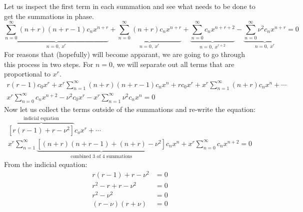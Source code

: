 Let us inspect the first term in each summation and see what needs to be done to get the summations in phase.
\begin{equation*}
\underbrace{\sum\limits_{n=0}^{\infty}(n+r)(n+r-1)c_nx^{n+r}}_{n=0, \ x^r} + \underbrace{\sum\limits_{n=0}^{\infty}(n+r)c_nx^{n+r}}_{n=0, \ x^r} + \underbrace{\sum\limits_{n=0}^{\infty}c_nx^{n+r+2}}_{n=0, \ x^{r+2}} - \underbrace{\sum\limits_{n=0}^{\infty}\nu^2c_n x^{n+r}}_{n=0, \ x^r} = 0
\end{equation*}
For reasons that (hopefully) will become apparant, we are going to go through this process in two steps.  For $n=0$, we will separate out all terms that are proportional to $x^r$.
\begin{multline*}
r(r-1)c_0x^r + x^r\sum\limits_{n=1}^{\infty}(n+r)(n+r-1)c_nx^n + rc_0x^r + x^r\sum\limits_{n=1}^{\infty}(n+r)c_nx^n + \cdots \\
x^r\sum\limits_{n=0}^{\infty}c_nx^{n+2} - \nu^2c_0x^r - x^r\sum\limits_{n=1}^{\infty}\nu^2c_nx^{n} = 0
\end{multline*}
Now let us collect the terms outside of the summations and re-write the equation:
\begin{multline*}
\overbrace{\left[r(r-1)+r - \nu^2 \right]}^{\text{indicial equation}}c_ox^r + \cdots \\ x^r\sum\limits_{n=1}^{\infty}\underbrace{\left[(n+r)(n+r-1) + (n+r) - \nu^2\right]}_{\text{combined 3 of 4 summations}}c_nx^n +  x^r\sum\limits_{n=0}^{\infty}c_nx^{n+2} = 0
\end{multline*}
From the indicial equation:
\begin{align*}
r(r-1)+r-\nu^2 &= 0\\
r^2 - r + r - \nu^2 &= 0 \\
r^2 - \nu^2 &= 0 \\
(r - \nu)(r+\nu) &= 0
\end{align*}
